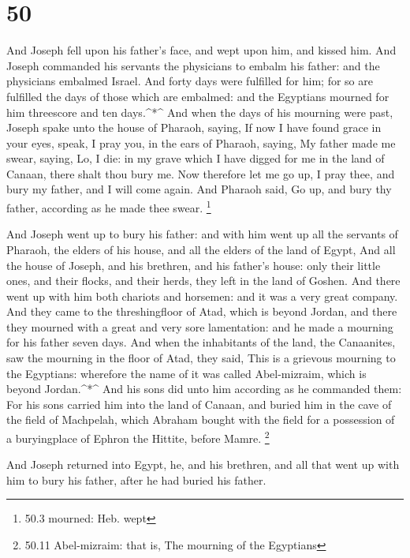 \hypertarget{section-49}{%
\section{50}\label{section-49}}

 And Joseph fell upon his father's face, and wept upon him,
and kissed him.  And Joseph commanded his servants the
physicians to embalm his father: and the physicians embalmed Israel.
 And forty days were fulfilled for him; for so are fulfilled
the days of those which are embalmed: and the Egyptians mourned for him
threescore and ten days.\^{}*\^{}  And when the days of his
mourning were past, Joseph spake unto the house of Pharaoh, saying, If
now I have found grace in your eyes, speak, I pray you, in the ears of
Pharaoh, saying,  My father made me swear, saying, Lo, I
die: in my grave which I have digged for me in the land of Canaan, there
shalt thou bury me. Now therefore let me go up, I pray thee, and bury my
father, and I will come again.  And Pharaoh said, Go up, and
bury thy father, according as he made thee swear. \footnote{50.3
  mourned: Heb. wept}

 And Joseph went up to bury his father: and with him went up
all the servants of Pharaoh, the elders of his house, and all the elders
of the land of Egypt,  And all the house of Joseph, and his
brethren, and his father's house: only their little ones, and their
flocks, and their herds, they left in the land of Goshen. 
And there went up with him both chariots and horsemen: and it was a very
great company.  And they came to the threshingfloor of
Atad, which is beyond Jordan, and there they mourned with a great and
very sore lamentation: and he made a mourning for his father seven days.
 And when the inhabitants of the land, the Canaanites, saw
the mourning in the floor of Atad, they said, This is a grievous
mourning to the Egyptians: wherefore the name of it was called
Abel-mizraim, which is beyond Jordan.\^{}*\^{}  And his
sons did unto him according as he commanded them:  For his
sons carried him into the land of Canaan, and buried him in the cave of
the field of Machpelah, which Abraham bought with the field for a
possession of a buryingplace of Ephron the Hittite, before Mamre.
\footnote{50.11 Abel-mizraim: that is, The mourning of the Egyptians}

 And Joseph returned into Egypt, he, and his brethren, and
all that went up with him to bury his father, after he had buried his
father.

